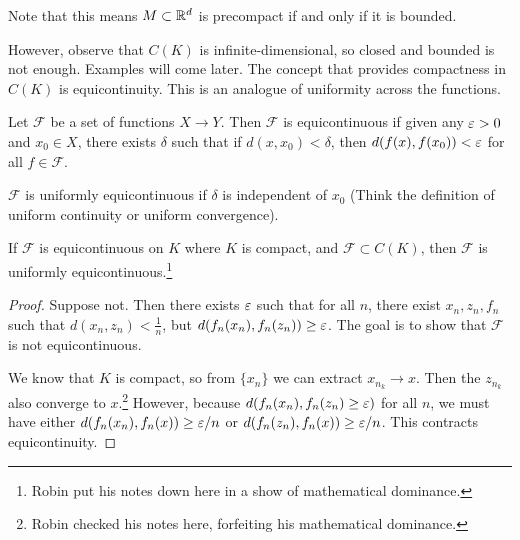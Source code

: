 \documentclass[10pt, twoside]{article}
\begin{document}
    Note that this means $M \subset \mathbb{R}^d$ is precompact if and only if it is
    bounded.

    However, observe that $C(K)$ is infinite-dimensional, so closed and bounded
    is not enough. Examples will come later. The concept that provides
    compactness in $C(K)$ is equicontinuity. This is an analogue of uniformity
    across the functions.

    \begin{defn}[Equicontinuity] Let $\mathcal{F}$ be a set of functions $X
        \rightarrow Y$. Then $\mathcal{F}$ is equicontinuous if given any $\varepsilon
        > 0$ and $x_0 \in X$, there exists $\delta$ such that if $d(x,x_0) <
        \delta$, then $d(f(x), f(x_0)) < \varepsilon$ for all $f \in \mathcal{F}$.
    \end{defn}

    \begin{defn} $\mathcal{F}$ is uniformly
    equicontinuous if $\delta$ is independent of $x_0$ (Think the definition of
uniform continuity or uniform convergence).  \end{defn}

    \begin{thm} If $\mathcal{F}$ is equicontinuous on $K$ where $K$ is compact,
        and $\mathcal{F} \subset C(K)$, then $\mathcal{F}$ is uniformly
        equicontinuous.\footnote{Robin put his notes down here in a show of
        mathematical dominance.} \begin{proof} Suppose not. Then there exists
            $\varepsilon$ such that for all $n$, there exist $x_n,z_n,f_n$ such that
            $d(x_n,z_n) < \frac{1}{n}$, but $d(f_n(x_n), f_n(z_n)) \geq \varepsilon$.
            The goal is to show that $\mathcal{F}$ is not equicontinuous. 
            
            We know that $K$ is compact, so from $\{x_n\}$ we can extract
        $x_{n_k} \rightarrow x$. Then the $z_{n_k}$ also converge to
    $x$.\footnote{Robin checked his notes here, forfeiting his mathematical
dominance.} However, because $d(f_n(x_n), f_n(z_n) \geq \varepsilon)$ for all $n$, we
must have either $d(f_n(x_n), f_n(x)) \geq \varepsilon / n$ or $d(f_n(z_n), f_n(x))
\geq \varepsilon / n$. This contracts equicontinuity.  \end{proof} \end{thm}
\end{document}
